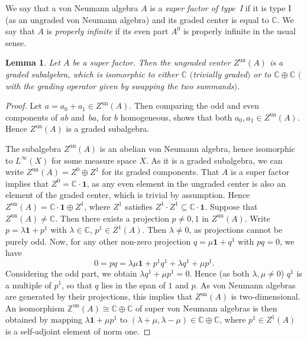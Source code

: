 \documentclass[11pt]{article}
\numberwithin{equation}{section}
\numberwithin{equation}{section}
\newtheorem{Lemma}[Theorem]{Lemma}
\newcommand{\Z}{\mathbb{Z}}
\newcommand{\C}{\mathbb{C}}
\begin{document}
\begin{Definition}
We say that a von Neumann algebra $A$ is a \emph{super factor of type~I} if it is type I (as an ungraded von Neumann algebra) and its graded center is equal to $\C$.
We say that $A$ is \emph{properly infinite} if its even part $A^0$ is properly infinite in the usual sense.
\end{Definition}


\begin{Lemma}
\label{LemmaCenterOfSuperFactor}
 Let $A$ be a super factor.
 Then the ungraded center $Z^{\mathrm{un}}(A)$ is a graded subalgebra, which is isomorphic to either $\C$ $($trivially graded$)$ or to $\C \oplus \C$ $($with the grading operator given by swapping the two summands$)$.
\end{Lemma}

\begin{proof}
Let $a = a_0 + a_1 \in Z^{\mathrm{un}}(A)$.
Then comparing the odd and even components of $ab$ and~$ba$, for $b$ homogeneous, shows that both $a_0, a_1 \in Z^{\mathrm{un}}(A)$.
Hence $Z^{\mathrm{un}}(A)$ is a graded subalgebra.

The subalgebra $Z^{\mathrm{un}}(A)$ is an abelian von Neumann algebra, hence isomorphic to $L^\infty(X)$ for some measure space $X$.
As it is a graded subalgebra, we can write $Z^{\mathrm{un}}(A) = Z^0 \oplus Z^1$ for its graded components.
That $A$ is a super factor implies that $Z^0 = \C \cdot \mathbf{1}$, as any even element in the ungraded center is also an element of the graded center, which is trivial by assumption.
Hence $Z^{\mathrm{un}}(A) = \C\cdot \mathbf{1} \oplus Z^1$, where $Z^1$ satisfies $Z^1 \cdot Z^1 \subseteq \C\cdot \mathbf{1}$.
Suppose that $Z^{\mathrm{un}}(A) \neq \C$.
Then there exists a projection $p \neq 0, 1$ in $Z^{\mathrm{un}}(A)$.
Write $p = \lambda \mathbf{1} + p^1$ with $\lambda \in \C$, $p^1 \in Z^1(A)$.
Then $\lambda \neq 0$, as projections cannot be purely odd.
Now, for any other non-zero projection $q = \mu \mathbf{1} + q^1$ with $pq = 0$, we have
\begin{equation*}
 0 = pq = \lambda \mu \mathbf{1} + p^1q^1 + \lambda q^1 + \mu p^1.
\end{equation*}
Considering the odd part, we obtain $\lambda q^1 + \mu p^1 = 0$.
Hence (as both $\lambda, \mu \neq 0$) $q^1$ is a multiple of $p^1$, so that $q$ lies in the span of $1$ and $p$.
As von Neumann algebras are generated by their projections, this implies that $Z^{\mathrm{un}}(A)$ is two-dimensional.
An isomorphism $\Z^{\mathrm{un}}(A) \cong \C \oplus \C$ of super von Neumann algebras is then obtained by mapping $\lambda \mathbf{1} + \mu p^1$ to $(\lambda + \mu, \lambda - \mu) \in \C \oplus\C$, where $p^1 \in Z^1(A)$ is a self-adjoint element of norm one.
\end{proof}
\end{document}
